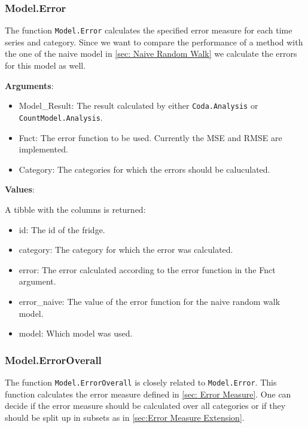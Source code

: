 \subsubsection{Model.Error}
\label{sec:Model.Error}

The function \texttt{Model.Error} calculates the specified error measure for each time series and category. Since we want to compare the performance of a method with the one of the naive model in \ref{sec: Naive Random Walk} we calculate the errors for this model as well. 

\textbf{Arguments}:

\begin{itemize}
	\item Model\_Result: The result calculated by either \texttt{Coda.Analysis} or \texttt{CountModel.Analysis}.
	\item Fnct: The error function to be used. Currently the MSE and RMSE are implemented. 
	\item Category: The categories for which the errors should be caluculated.
\end{itemize}

\textbf{Values}:

A tibble with the columns is returned: 

\begin{itemize}
	\item id: The id of the fridge.
	\item category: The category for which the error was calculated. 
	\item error: The error calculated according to the error function in the Fnct argument. 
	\item error\_naive: The value of the error function for the naive random walk model.
	\item model: Which model was used. 
\end{itemize}

\subsubsection{Model.ErrorOverall}
\label{sec:Model.ErrorOverall}

The function \texttt{Model.ErrorOverall} is closely related to \texttt{Model.Error}. This function calculates the error measure defined in \ref{sec: Error Measure}. One can decide if the error measure should be calculated over all categories or if they should be split up in subsets as in \ref{sec:Error Measure Extension}.

